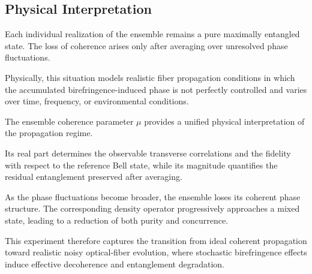 
\subsection*{Physical Interpretation}

Each individual realization of the ensemble remains a pure maximally entangled state. The loss of coherence arises only after averaging over unresolved phase fluctuations.

Physically, this situation models realistic fiber propagation conditions in which the accumulated birefringence-induced phase is not perfectly controlled and varies over time, frequency, or environmental conditions.

The ensemble coherence parameter \( \mu \) provides a unified physical interpretation of the propagation regime.

Its real part determines the observable transverse correlations and the fidelity with respect to the reference Bell state, while its magnitude quantifies the residual entanglement preserved after averaging.

As the phase fluctuations become broader, the ensemble loses its coherent phase structure. The corresponding density operator progressively approaches a mixed state, leading to a reduction of both purity and concurrence.

This experiment therefore captures the transition from ideal coherent propagation toward realistic noisy optical-fiber evolution, where stochastic birefringence effects induce effective decoherence and entanglement degradation.